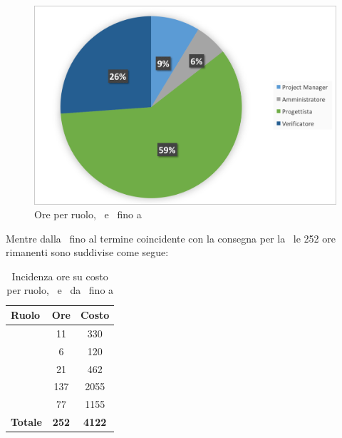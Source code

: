 \begin{figure}[H]
	\centering 
	\includegraphics[scale=0.7]{Immagini/GraficiTorteSezione6/PD.png}
	\caption{Ore per ruolo, \PD\ e \COD\ fino a \RP}
\end{figure}

\newpage
Mentre dalla \RP\ fino al termine coincidente con la consegna per la \RQ\ le 252 ore rimanenti sono suddivise come segue:

\begin{table}[h]
	\begin{center}
		\begin{tabular}{|l|c|c|}
			\hline
			\textbf{Ruolo}	& \textbf{Ore} &	\textbf{Costo}	\\
			\hline
			\Pm &	11 & 330\\
			\hline
			\Am	&	6 & 120\\
			\hline
			\Prog	&	21 & 462\\
			\hline
			\Progr	&	137 & 2055\\
			\hline
			\Ver	&	77 & 1155\\
			\hline
			\textbf{Totale} &	 \textbf{252}	&	\textbf{4122}\\
			\hline
		\end{tabular}
	\end{center}
	\caption{Incidenza ore su costo per ruolo, \PD\ e \COD\ da \RP\ fino a \RQ}
\end{table}

